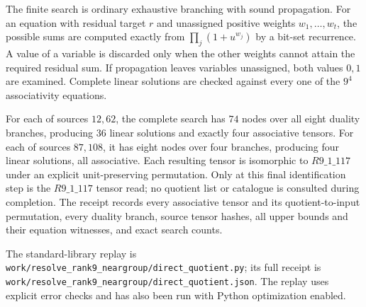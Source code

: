 The finite search is ordinary exhaustive branching with sound propagation.
For an equation with residual target $r$ and unassigned positive weights
$w_1,\ldots,w_t$, the possible sums are computed exactly from
$\prod_j(1+u^{w_j})$ by a bit-set recurrence. A value of a variable is
discarded only when the other weights cannot attain the required residual
sum. If propagation leaves variables unassigned, both values $0,1$ are
examined. Complete linear solutions are checked against every one of the
$9^4$ associativity equations.

For each of sources $12,62$, the complete search has $74$ nodes over all
eight duality branches, producing $36$ linear solutions and exactly four
associative tensors. For each of sources $87,108$, it has eight nodes over
four branches, producing four linear solutions, all associative.
Each resulting tensor is isomorphic to $R9\_1\_117$ under an explicit
unit-preserving permutation. Only at this final identification step is the
$R9\_1\_117$ tensor read; no quotient list or catalogue is consulted during
completion. The receipt records every associative tensor and its
quotient-to-input permutation, every duality branch, source tensor hashes,
all upper bounds and their equation witnesses, and exact search counts.

The standard-library replay is
\nolinkurl{work/resolve_rank9_neargroup/direct_quotient.py}; its full receipt is
\nolinkurl{work/resolve_rank9_neargroup/direct_quotient.json}.
The replay uses explicit error checks and has also been run with Python
optimization enabled.
